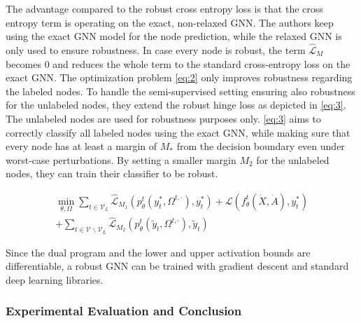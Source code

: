 \documentclass[a4paper,preprint]{sig-alternate}
\begin{document}
The advantage compared to the robust cross entropy loss is that the cross entropy term is operating on the exact, non-relaxed GNN.
The authors keep using the exact GNN model for the node prediction, while the relaxed GNN is only used to ensure robustness. 
In case every node is robust, the term $\mathcal{\hat{L}}_M$ becomes $0$ and reduces the whole term to the standard cross-entropy loss 
on the exact GNN.\newline
The optimization problem \ref{eq:2} only improves robustness regarding the labeled nodes.
To handle the semi-supervised setting ensuring also robustness for the unlabeled nodes, they extend the robust hinge loss
as depicted in \ref{eq:3}. The unlabeled nodes are used for robustness purposes only. \ref{eq:3} aims to correctly classify all labeled 
nodes using the exact GNN, while making sure that every node has at least a margin of $M_{\ast}$ from the decision boundary even under
worst-case perturbations. By setting a smaller margin $M_2$ for the unlabeled nodes, they can train their classifier to be robust.

\begin{multline}
\label{eq:3}
    \min_{\theta, \Omega} \sum_{t \in \mathcal{V}_L} \mathcal{\hat{L}}_{M_1} (p_{\theta}^t (y_t^{\ast}, \Omega^{t, \cdot}), y_t^{\ast}) + \mathcal{L} (f_{\theta}^t (\dot{X}, \dot{A}), y_t^{\ast}) \\
    + \sum_{t \in \mathcal{V} \backslash \mathcal{V}_L} \mathcal{\hat{L}}_{M_2} (p_{\theta}^t (\tilde{y}_t, \Omega^{t, \cdot}), \tilde{y}_t)
\end{multline}

Since the dual program and the lower and upper activation bounds are differentiable, a robust GNN can be trained with gradient descent 
and standard deep learning libraries.

\subsubsection{Experimental Evaluation and Conclusion}
\end{document}
